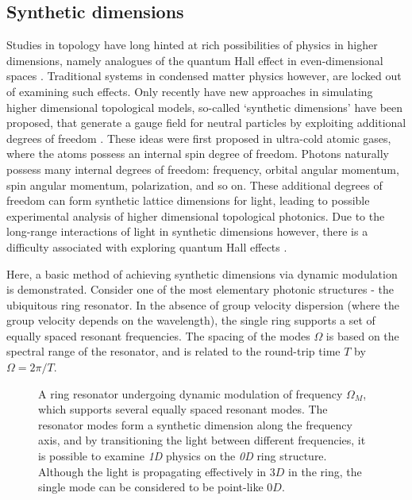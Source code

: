 \subsection{Synthetic dimensions}

Studies in topology have long hinted at rich possibilities of physics in higher dimensions, namely analogues of the quantum Hall effect in even-dimensional spaces \cite{Zhang2001}. Traditional systems in condensed matter physics however, are locked out of examining such effects. Only recently have new approaches in simulating higher dimensional topological models, so-called ‘synthetic dimensions’ have been proposed, that generate a gauge field for neutral particles by exploiting additional degrees of freedom \cite{Price2017,Saito2017,Barbarino2016}. These ideas were first proposed in ultra-cold atomic gases\cite{Stuhl2015a,Boada2012}, where the atoms possess an internal spin degree of freedom. Photons naturally possess many internal degrees of freedom: frequency, orbital angular momentum, spin angular momentum, polarization, and so on. These additional degrees of freedom can form synthetic lattice dimensions for light, leading to possible experimental analysis of higher dimensional topological photonics. Due to the long-range interactions of light in synthetic dimensions however, there is a difficulty associated with exploring quantum Hall effects \cite{acki2016,Zeng2015}.
  
Here, a basic method of achieving synthetic dimensions via dynamic modulation is demonstrated. Consider one of the most elementary photonic structures - the ubiquitous ring resonator. In the absence of group velocity dispersion (where the group velocity depends on the wavelength), the single ring supports a set of equally spaced resonant frequencies. The spacing of the modes $\Omega$ is based on the spectral range of the resonator, and is related to the round-trip time $T$ by $\Omega =  2 \pi /T$.

\begin{figure}[t]
	\centering
	\def\svgwidth{0.5\textwidth}
	\begin{normalsize}
		
	\end{normalsize}
	\caption[Modulated ring resonator with a synthetic dimension]{A ring resonator undergoing dynamic modulation of frequency $\Omega_M$, which supports several equally spaced resonant modes. The resonator modes form a synthetic dimension along the frequency axis, and by transitioning the light between different frequencies, it is possible to examine \textit{1D} physics on the \textit{0D} ring structure. Although the light is propagating effectively in $3D$ in the ring, the single mode can be considered to be point-like $0D$.}
	\label{fig:syntheticring}
\end{figure} 

